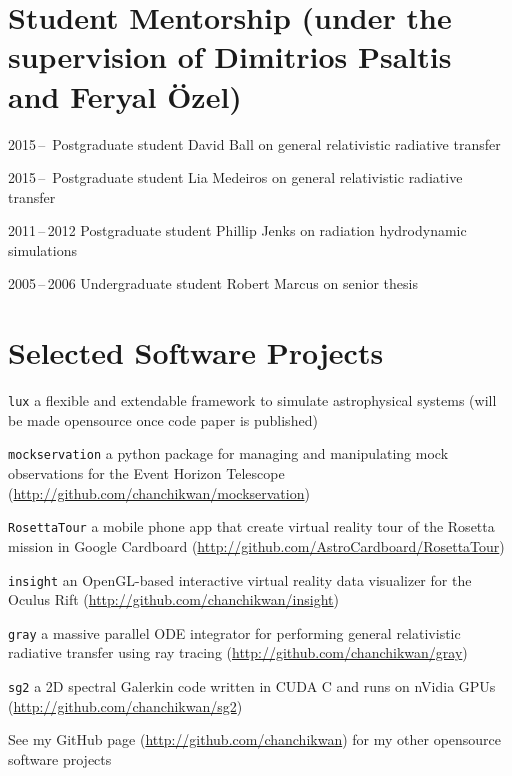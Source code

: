 \section*{Student Mentorship {\normalsize\normalfont
    (under the supervision of Dimitrios Psaltis and Feryal \"Ozel)}}

\begin{tlist}

\item[2015\,--\,] Postgraduate student David Ball on general
  relativistic radiative transfer

\item[2015\,--\,] Postgraduate student Lia Medeiros on general
  relativistic radiative transfer

\item[2011\,--\,2012] Postgraduate student Phillip Jenks on radiation
  hydrodynamic simulations

\item[2005\,--\,2006] Undergraduate student Robert Marcus on senior
  thesis

\end{tlist}

\section*{Selected Software Projects}

\begin{Tlist}

\item[\texttt{lux}] a flexible and extendable framework to simulate
  astrophysical systems (will be made opensource once code paper is
  published)

\item[\texttt{mockservation}] a python package for managing and
  manipulating mock observations for the Event Horizon Telescope
  (\url{http://github.com/chanchikwan/mockservation})

\item[\texttt{RosettaTour}] a mobile phone app that create virtual
  reality tour of the Rosetta mission in Google Cardboard
  (\url{http://github.com/AstroCardboard/RosettaTour})

\item[\texttt{insight}] an OpenGL-based interactive virtual reality
  data visualizer for the Oculus Rift
  (\url{http://github.com/chanchikwan/insight})

\item[\texttt{gray}] a massive parallel ODE integrator for performing
  general relativistic radiative transfer using ray tracing
  (\url{http://github.com/chanchikwan/gray})

\item[\texttt{sg2}] a 2D spectral Galerkin code written in CUDA C and
  runs on nVidia GPUs (\url{http://github.com/chanchikwan/sg2})

\end{Tlist}

\noindent See my GitHub page (\url{http://github.com/chanchikwan}) for
my other opensource software projects

